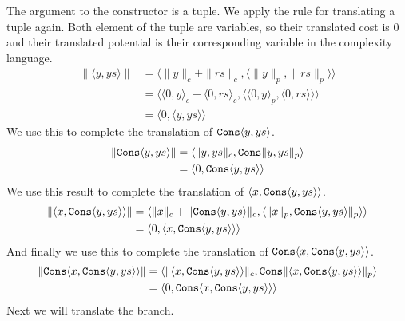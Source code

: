 %
The argument to the constructor is a tuple. We apply the rule for translating a
tuple again. Both element of the tuple are variables, so their translated cost
is $0$ and their translated potential is their corresponding variable in the
complexity language.
%
\begin{align*}
  \|\langle y,ys\rangle\| &= \langle \|y\|_c + \|rs\|_c, \langle\|y\|_p,\|rs\|_p\rangle\rangle \\
                         &= \langle \langle 0,y\rangle_c + \langle 0, rs\rangle_c, \langle \langle0,y\rangle_p, \langle 0,rs\rangle\rangle\rangle \\
                         &= \langle 0, \langle y,ys\rangle\rangle
\end{align*}
%
We use this to complete the translation of $\texttt{Cons}\langle y,ys\rangle$.
%
\begin{align*}
  \|\texttt{Cons}\langle y,ys\rangle\| &= \langle \|y,ys\|_c, \texttt{Cons}\|y,ys\|_p\rangle \\
                                  &= \langle 0, \texttt{Cons}\langle y,ys\rangle\rangle
\end{align*}
%
We use this result to complete the translation of $\langle x,\texttt{Cons}\langle y,ys\rangle\rangle$.
%
\begin{align*}
  \|\langle x, \texttt{Cons}\langle y,ys\rangle\rangle\| &= \langle \|x\|_c + \|\texttt{Cons}\langle y,ys\rangle\|_c, \langle \|x\|_p,\texttt{Cons}\langle y,ys\rangle\|_p\rangle\rangle \\
                                                    &= \langle 0, \langle x,\texttt{Cons}\langle y,ys\rangle\rangle\rangle
\end{align*}
%
And finally we use this to complete the translation of $\texttt{Cons}\langle x,\texttt{Cons}\langle y,ys\rangle\rangle$.
%
\begin{align*}
  \|\texttt{Cons}\langle x,\texttt{Cons}\langle y,ys \rangle\rangle\| &= \langle \|\langle x, \texttt{Cons} \langle y,ys\rangle\rangle\|_c, \texttt{Cons}\|\langle x,\texttt{Cons}\langle y,ys\rangle\rangle\|_p\rangle \\
                                                            &= \langle 0, \texttt{Cons}\langle x,\texttt{Cons}\langle y,ys\rangle\rangle\rangle
\end{align*}
%
%
%
Next we will translate the  branch.

